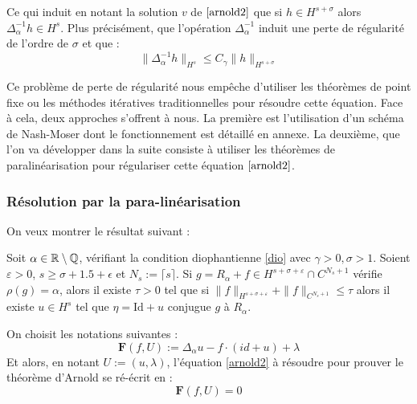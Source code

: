 \documentclass[11pt,a4paper]{article}
\begin{document}
Ce qui induit en notant la solution $v$ de $\eqref{arnold2}$ que si $h \in H^{s+\sigma}$ alors $\Delta_\alpha^{-1}h \in H^{s}$. Plus précisément, que l'opération $\Delta_{\alpha}^{-1}$ induit une perte de régularité de l'ordre de $\sigma$ et que :
\begin{equation}\label{dio}
\|\Delta_\alpha^{-1}h\|_{H^s} \leq C_\gamma \|h\|_{H^{s+\sigma}}
\end{equation}
\par
Ce problème de perte de régularité nous empêche d'utiliser les théorèmes de point fixe ou les méthodes itératives traditionnelles pour résoudre cette équation. Face à cela, deux approches s'offrent à nous. La première est l'utilisation d'un schéma de Nash-Moser dont le fonctionnement est détaillé en annexe. La deuxième, que l'on va développer dans la suite consiste à utiliser les théorèmes de paralinéarisation pour régulariser cette équation $\eqref{arnold2}$.
\subsubsection{Résolution par la para-linéarisation}
On veux montrer le résultat suivant :
\begin{thm}[Arnold]
Soit $\alpha \in \mathbb R\setminus \mathbb Q$, vérifiant la condition diophantienne \eqref{dio} avec $\gamma > 0, \sigma > 1$. Soient $\varepsilon >0$, $s\geq \sigma + 1.5 + \epsilon$ et $N_s := \lceil s \rceil$. Si $g=R_\alpha + f \in H^{s+\sigma + \varepsilon}\cap C^{N_s+1}$ vérifie $\rho(g)=\alpha$, alors il existe $\tau > 0$ tel que si $\|f\|_{H^{s+\sigma + \varepsilon}} + \|f\|_ {C^{N_s+1}} \leq \tau$ alors il existe $u \in H^s$ tel que $\eta = \text{Id} + u$ conjugue $g$ à $R_\alpha$.
\end{thm}

On choisit les notations suivantes :
\begin{equation*}
\mathbf{F}(f,U) :=\Delta_\alpha u - f \cdot (id +u) + \lambda
\end{equation*}
Et alors, en notant $U:=(u,\lambda)$, l'équation \eqref{arnold2} à résoudre pour prouver le théorème d'Arnold se ré-écrit en :
\begin{equation}\label{equ_reso}
\mathbf{F}(f,U)=0
\end{equation} 
\end{document}

